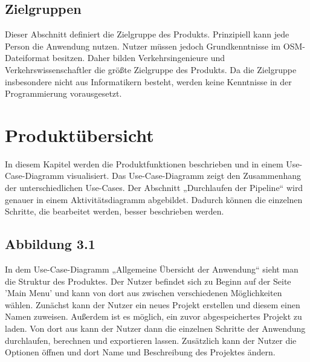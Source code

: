 \documentclass[parskip=full]{scrartcl} %
\begin{document}

\subsection{Zielgruppen}
Dieser Abschnitt definiert die Zielgruppe des Produkts. Prinzipiell kann jede Person die Anwendung nutzen. Nutzer müssen jedoch Grundkenntnisse im OSM-Dateiformat besitzen. Daher bilden Verkehrsingenieure und Verkehrswissenschaftler die größte Zielgruppe des Produkts. Da die Zielgruppe insbesondere nicht aus Informatikern besteht, werden keine Kenntnisse in der Programmierung vorausgesetzt.
\newpage

\section{Produktübersicht}
In diesem Kapitel werden die Produktfunktionen beschrieben und in einem Use-Case-Diagramm visualisiert. Das Use-Case-Diagramm zeigt den Zusammenhang der unterschiedlichen Use-Cases. Der Abschnitt „Durchlaufen der Pipeline“ wird genauer in einem Aktivitätsdiagramm abgebildet. Dadurch können die einzelnen Schritte, die bearbeitet werden, besser beschrieben werden.

\subsection*{Abbildung 3.1}
In dem Use-Case-Diagramm „Allgemeine Übersicht der Anwendung“ sieht man die Struktur des Produktes. Der Nutzer befindet sich zu Beginn auf der Seite 'Main Menu' und kann von dort aus zwischen verschiedenen Möglichkeiten wählen.
Zunächst kann der Nutzer ein neues Projekt erstellen und diesem einen Namen zuweisen. Außerdem ist es möglich, ein zuvor abgespeichertes Projekt zu laden. Von dort aus kann der Nutzer dann die einzelnen Schritte der Anwendung durchlaufen, berechnen und exportieren lassen. 
Zusätzlich kann der Nutzer die Optionen öffnen und dort Name und Beschreibung des Projektes ändern.
\end{document}
